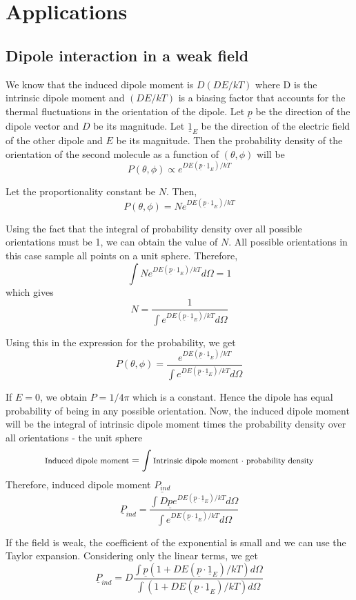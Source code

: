 \documentclass[11pt, letterpaper]{article}
\newcommand{\1}{\bm{1}}
\newcommand{\un}[1]{\underline{#1}}
\begin{document}
\section{Applications} 

\subsection{Dipole interaction in a weak field}
We know that the induced dipole moment is $D(DE/kT)$ where D is the intrinsic dipole moment and $(DE/kT)$ is a biasing factor that accounts for the thermal fluctuations in the orientation of the dipole. Let $\un{p}$ be the direction of the dipole vector and $D$ be its magnitude. Let $\un{1}_E$ be the direction of the electric field of the other dipole and $E$ be its magnitude. Then the probability density of the orientation of the second molecule as a function of $(\theta, \phi)$ will be
$$
P(\theta, \phi) \propto e^{DE(\un{p}\cdot \un{1}_E)/kT}
$$

Let the proportionality constant be $N$. Then,
$$
P(\theta, \phi) = N e^{DE(\un{p}\cdot \un{1}_E)/kT}
$$

Using the fact that the integral of probability density over all possible orientations must be 1, we can obtain the value of $N$. All possible orientations in this case sample all points on a unit sphere. Therefore,
$$
\int N e^{DE(\un{p}\cdot \un{1}_E)/kT} d\Omega = 1
$$
which gives
$$
N=\frac{1}{\int e^{DE(\un{p}\cdot \un{1}_E)/kT} d\Omega}
$$

Using this in the expression for the probability, we get
$$
P(\theta, \phi) = \frac{e^{DE(\un{p}\cdot \un{1}_E)/kT}}{\int e^{DE(\un{p}\cdot \un{1}_E)/kT} d\Omega}
$$

If $E=0$, we obtain $P=1/4\pi$ which is a constant. Hence the dipole has equal probability of being in any possible orientation. Now, the induced dipole moment will be the integral of intrinsic dipole moment times the probability density over all orientations - the unit sphere
$$
\text{\footnotesize{Induced dipole moment}} = \int \text{\footnotesize{Intrinsic dipole moment $\cdot$ probability density}}  
$$
Therefore, induced dipole moment $\un{P_{ind}}$
$$
\un{P}_{ind} = \frac{\int D \un{p}e^{DE(\un{p}\cdot \un{1}_E)/kT}d\Omega}{\int e^{DE(\un{p}\cdot \un{1}_E)/kT}d\Omega}
$$

If the field is weak, the coefficient of the exponential is small and we can use the Taylor expansion. Considering only the linear terms, we get
$$
\un{P}_{ind} = D\frac{\int \un{p}(1 + DE(\un{p}\cdot \un{1}_E)/kT)d\Omega}{\int (1+DE(\un{p}\cdot \un{1}_E)/kT)d\Omega}
$$
\end{document}
